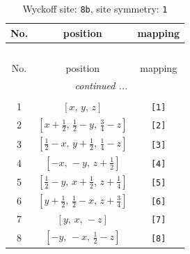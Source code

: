 \documentclass[fleqn,8pt]{jsarticle}
\begin{document}
\begin{longtable}{ccc}
\caption{Wyckoff site: {\tt 8b}, site symmetry: {\tt 1}}
 \\
 \hline \hline
No. & position & mapping \\ \hline \endfirsthead

\multicolumn{2}{l}{\tablename\ \thetable{}} \\
 \hline \hline
No. & position & mapping \\ \hline \endhead

 \hline \hline
\multicolumn{2}{r}{\footnotesize\it continued ...} \\ \endfoot

 \hline \hline
\multicolumn{2}{r}{} \\ \endlastfoot

1 & $\left[ x,\, y,\, z \right]$ & {\tt [1]} \\ \hline
2 & $\left[ x + \frac{1}{2},\, \frac{1}{2} - y,\, \frac{3}{4} - z \right]$ & {\tt [2]} \\ \hline
3 & $\left[ \frac{1}{2} - x,\, y + \frac{1}{2},\, \frac{1}{4} - z \right]$ & {\tt [3]} \\ \hline
4 & $\left[ - x,\, - y,\, z + \frac{1}{2} \right]$ & {\tt [4]} \\ \hline
5 & $\left[ \frac{1}{2} - y,\, x + \frac{1}{2},\, z + \frac{1}{4} \right]$ & {\tt [5]} \\ \hline
6 & $\left[ y + \frac{1}{2},\, \frac{1}{2} - x,\, z + \frac{3}{4} \right]$ & {\tt [6]} \\ \hline
7 & $\left[ y,\, x,\, - z \right]$ & {\tt [7]} \\ \hline
8 & $\left[ - y,\, - x,\, \frac{1}{2} - z \right]$ & {\tt [8]} \\
\end{longtable}
\end{document}
